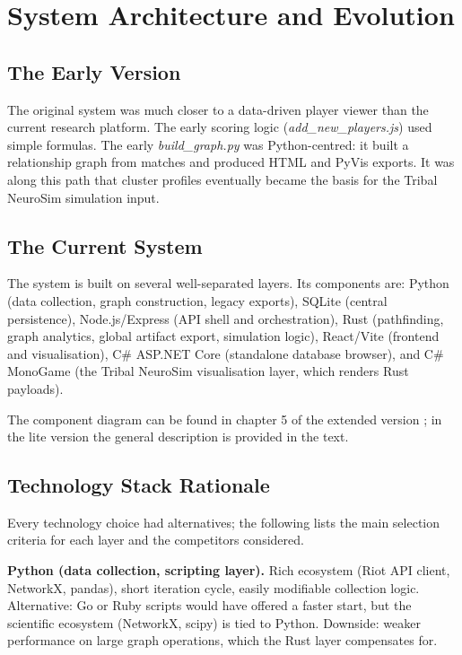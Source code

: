 \chapter{System Architecture and Evolution}

\section{The Early Version}

The original system was much closer to a data-driven player viewer than the current research platform. The early scoring logic (\textit{add\_new\_players.js}) used simple formulas. The early \textit{build\_graph.py} was Python-centred: it built a relationship graph from matches and produced HTML and PyVis exports. It was along this path that cluster profiles eventually became the basis for the Tribal NeuroSim simulation input.

\section{The Current System}

The system is built on several well-separated layers. Its components are: Python (data collection, graph construction, legacy exports), SQLite (central persistence), Node.js/Express (API shell and orchestration), Rust (pathfinding, graph analytics, global artifact export, simulation logic), React/Vite (frontend and visualisation), C\# ASP.NET Core (standalone database browser), and C\# MonoGame (the Tribal NeuroSim visualisation layer, which renders Rust payloads).

The component diagram can be found in chapter 5 of the extended version \cite{premadegraph-full}; in the lite version the general description is provided in the text.

\section{Technology Stack Rationale}

Every technology choice had alternatives; the following lists the main selection criteria for each layer and the competitors considered.

\textbf{Python (data collection, scripting layer).} Rich ecosystem (Riot API client, NetworkX, pandas), short iteration cycle, easily modifiable collection logic. Alternative: Go or Ruby scripts would have offered a faster start, but the scientific ecosystem (NetworkX, scipy) is tied to Python. Downside: weaker performance on large graph operations, which the Rust layer compensates for.

